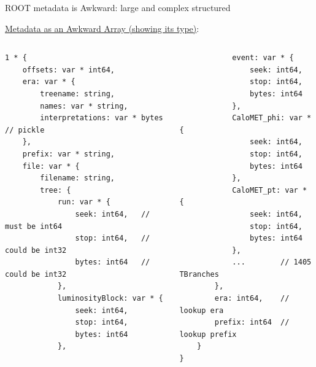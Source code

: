 \documentclass[aspectratio=169]{beamer}
\begin{document}
\begin{frame}[fragile]{ROOT metadata is Awkward: large and complex structured}
\vspace{0.3 cm}

\underline{Metadata as an Awkward Array (showing its type)}:

\vspace{-0.1 cm}
\scriptsize
\begin{columns}
\begin{verbatim}
1 * {
    offsets: var * int64,
    era: var * {
        treename: string,
        names: var * string,
        interpretations: var * bytes   // pickle
    },
    prefix: var * string,
    file: var * {
        filename: string,
        tree: {
            run: var * {
                seek: int64,   // must be int64
                stop: int64,   // could be int32
                bytes: int64   // could be int32
            },
            luminosityBlock: var * {
                seek: int64,
                stop: int64,
                bytes: int64
            },
\end{verbatim}

\begin{verbatim}
            event: var * {
                seek: int64,
                stop: int64,
                bytes: int64
            },
            CaloMET_phi: var * {
                seek: int64,
                stop: int64,
                bytes: int64
            },
            CaloMET_pt: var * {
                seek: int64,
                stop: int64,
                bytes: int64
            },
            ...        // 1405 TBranches
        },
        era: int64,    // lookup era
        prefix: int64  // lookup prefix
    }
}
\end{verbatim}
\end{columns}

\end{frame}
\end{document}
